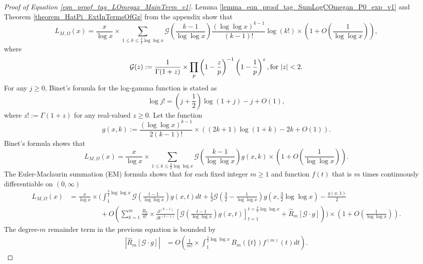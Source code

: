 \documentclass[11pt,reqno,a4letter]{article}
\newcommand{\hlocalref}[1]{\hyperref[#1]{\ref{#1}}}
\numberwithin{equation}{section}
\numberwithin{figure}{section}
\numberwithin{table}{section}
\newcommand{\seqnum}[1]{\href{http://oeis.org/#1}{\color{ProcessBlue}{\underline{#1}}}}
\theoremstyle{plain}
\numberwithin{theorem}{section}
\theoremstyle{definition}
\theoremstyle{remark}
\newcommand{\mathtext}[1]{\text{\rm #1}}
\begin{document}
\begin{proof}[Proof of Equation \eqref{eqn_proof_tag_LOmegax_MainTerm_v1}]
Lemma \hlocalref{lemma_eqn_proof_tag_SumLogCOmegan_P0_exp_v1} and 
Theorem \hlocalref{theorem_HatPi_ExtInTermsOfGz} from the appendix show that 
\[
L_{M,\Omega}(x) = \frac{x}{\log x} \times \sum_{1 \leq k \leq \frac{3}{2} \log\log x} 
	\mathcal{G}\left(\frac{k-1}{\log\log x}\right) \frac{(\log\log x)^{k-1}}{(k-1)!} 
	\log(k!) \times \left(1 + O\left(\frac{1}{\log\log x}\right)\right), 
\]
where 
\[
\mathcal{G}(z) := \frac{1}{\Gamma(1+z)} \times \prod_p \left(1 - \frac{z}{p}\right)^{-1} \left( 
	1 - \frac{1}{p}\right)^z, 
	\mathtext{ for } |z| < 2. 
\]
For any $j \geq 0$, 
Binet's formula for the log-gamma function is stated as 
\cite[\S 5.9(i)]{NISTHB} 
\[
\log j! = \left(j+\frac{1}{2}\right)\log(1+j) - j + O(1), 
\]
where $z! := \Gamma(1 + z)$ for any real-valued $z \geq 0$. 
Let the function 
$$g(x, k) := \frac{(\log\log x)^{k-1}}{2 (k-1)!} \times \left((2k+1) \log(1+k) - 2k + O(1)\right).$$ 
Binet's formula shows that 
\[
L_{M,\Omega}(x) = \frac{x}{\log x} \times \sum_{1 \leq k \leq \frac{3}{2} \log\log x} 
	\mathcal{G}\left(\frac{k-1}{\log\log x}\right) g(x, k) \times 
	\left(1 + O\left(\frac{1}{\log\log x}\right)\right). 
\]
The Euler-Maclaurin summation (EM) formula \cite[\S 9.5]{GKP} shows that 
for each fixed integer $m \geq 1$ and function $f(t)$ that is $m$ times 
continuously differentiable on $(0, \infty)$ 
\cite[\seqnum{A000367}; \seqnum{A002445}]{OEIS} 
\begin{align*}
L_{M,\Omega}(x) & = \frac{x}{\log x} \times \Biggl(
     \int_1^{\frac{3}{2} \log\log x} 
	\mathcal{G}\left(\frac{t-1}{\log\log x}\right) g(x, t) dt + 
     \frac{1}{2}\mathcal{G}\left(\frac{3}{2}-\frac{1}{\log\log x}\right) 
     g\left(x, \frac{3}{2} \log\log x\right) - \frac{g(x, 1)}{2} \\ 
	& \phantom{=\frac{x}{\log x} \times\ } + 
     O\left(\sum_{k=1}^{m} \frac{B_{k}}{k!} \times \frac{\partial^{(k-1)}}{\partial t^{(k-1)}} 
	\left[\mathcal{G}\left(\frac{t-1}{\log\log x}\right) g(x, t) 
     \right]_{t=1}^{t=\frac{3}{2}\log\log x} + \widehat{R}_{m}[\mathcal{G} \cdot g]\right) 
	\Biggr) \times \left(1 + O\left(\frac{1}{\log\log x}\right)\right). 
\end{align*}
The degree-$m$ remainder term in the previous equation is bounded by 
\begin{align*}
\left\lvert \widehat{R}_m[\mathcal{G} \cdot g] \right\rvert & = 
     O\left(\frac{1}{m!} \times \int_1^{\frac{3}{2} \log\log x} B_m(\{t\}) f^{(m)}(t) dt\right). 

\end{align*}
\end{proof}
\end{document}
